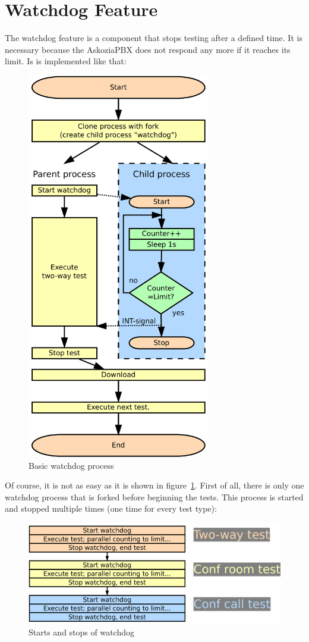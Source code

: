 \section{Watchdog Feature}
\label{sec:watchdog}

The watchdog feature is a component that stops testing after a defined time. It is necessary because the AskoziaPBX does not respond
any more if it reaches its limit. Is is implemented like that:

\begin{figure} [!ht]
\centering
\includegraphics [width=8cm] {watchdog-1}
\caption{Basic watchdog process}
\label{fig:watchdog-basic-process}
\end{figure}

\newpage
Of course, it is not as easy as it is shown in figure~\ref{fig:watchdog-basic-process}. First of all,
there is only one watchdog process that is forked before beginning the tests.
This process is started and stopped multiple times (one time for every test type):

\begin{figure} [!ht]
\centering
\includegraphics [width=14cm] {watchdog-2}
\caption{Starts and stops of watchdog}
\end{figure}


